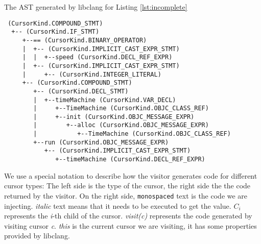 \documentclass{sfuthesis}
\begin{document}
\begin{listing}[H]
\caption{The AST generated by libclang for Listing \ref{lst:incomplete}}
\label{lst:ast}
\begin{verbatim}
 (CursorKind.COMPOUND_STMT)
  +-- (CursorKind.IF_STMT)
     +--== (CursorKind.BINARY_OPERATOR)
     |  +-- (CursorKind.IMPLICIT_CAST_EXPR_STMT)
     |  |  +--speed (CursorKind.DECL_REF_EXPR)
     |  +-- (CursorKind.IMPLICIT_CAST_EXPR_STMT)
     |     +-- (CursorKind.INTEGER_LITERAL)
     +-- (CursorKind.COMPOUND_STMT)
        +-- (CursorKind.DECL_STMT)
        |  +--timeMachine (CursorKind.VAR_DECL)
        |     +--TimeMachine (CursorKind.OBJC_CLASS_REF)
        |     +--init (CursorKind.OBJC_MESSAGE_EXPR)
        |        +--alloc (CursorKind.OBJC_MESSAGE_EXPR)
        |           +--TimeMachine (CursorKind.OBJC_CLASS_REF)
        +--run (CursorKind.OBJC_MESSAGE_EXPR)
           +-- (CursorKind.IMPLICIT_CAST_EXPR_STMT)
              +--timeMachine (CursorKind.DECL_REF_EXPR)
\end{verbatim}
\end{listing}

We use a special notation to describe how the visitor generates code for different cursor types: The left side is the type of the cursor, the right side the the code returned by the visitor. On the right side, \texttt{monospaced} text is the code we are injecting. \textit{italic} text means that it needs to be executed to get the value. $C_{i}$ represents the \emph{i}-th child of the cursor. \emph{visit(c)} represents the code generated by visiting cursor \emph{c}. \emph{this} is the current cursor we are visiting, it has some properties provided by libclang. 

\newcommand{\visitchild}[1]{\textit{visit($C_{#1}$)}}
\end{document}
